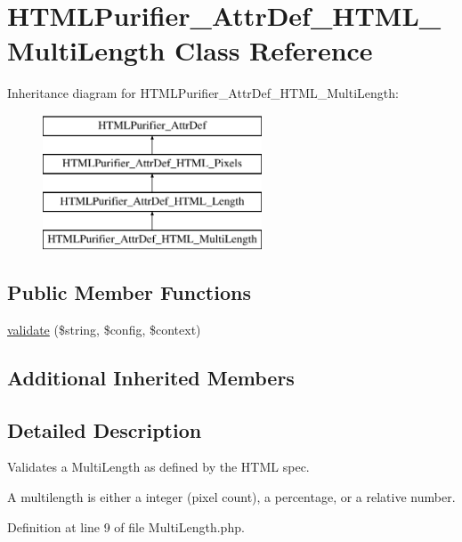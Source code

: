 \hypertarget{classHTMLPurifier__AttrDef__HTML__MultiLength}{\section{H\+T\+M\+L\+Purifier\+\_\+\+Attr\+Def\+\_\+\+H\+T\+M\+L\+\_\+\+Multi\+Length Class Reference}
\label{classHTMLPurifier__AttrDef__HTML__MultiLength}
}
Inheritance diagram for H\+T\+M\+L\+Purifier\+\_\+\+Attr\+Def\+\_\+\+H\+T\+M\+L\+\_\+\+Multi\+Length\+:\begin{figure}[H]
\begin{center}
\leavevmode
\includegraphics[height=4.000000cm]{classHTMLPurifier__AttrDef__HTML__MultiLength}
\end{center}
\end{figure}
\subsection*{Public Member Functions}
\begin{DoxyCompactItemize}
\item 
\hyperlink{classHTMLPurifier__AttrDef__HTML__MultiLength_a4f1d7ed98745371ad4b00e79de71013b}{validate} (\$string, \$config, \$context)
\end{DoxyCompactItemize}
\subsection*{Additional Inherited Members}


\subsection{Detailed Description}
Validates a Multi\+Length as defined by the H\+T\+M\+L spec.

A multilength is either a integer (pixel count), a percentage, or a relative number. 

Definition at line 9 of file Multi\+Length.\+php.



